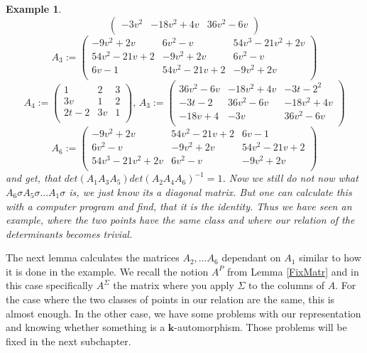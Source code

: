 \documentclass[12pt, oneside, reqno]{amsart}
\newtheorem{example}[theorem]{Example}
\begin{document}
\begin{example}
\[\begin{pmatrix}
        -3v^2 & -18 v^2 + 4v & 36v^2 - 6 v \\
    \end{pmatrix} \]
    \[A_3 := \begin{pmatrix}
        -9 v^2 + 2v & 6v^2 - v & 54v^3 - 21 v^2 + 2v \\
        54v^2 - 21 v + 2 & -9 v^2 + 2v & 6v^2 - v \\
        6v - 1 & 54v^2 - 21 v + 2 & -9 v^2 + 2v \\
    \end{pmatrix}\]
        \newline
     \[A_4 := \begin{pmatrix}
        1 & 2 & 3 \\
        3v & 1 & 2 \\
        2t-2 & 3v & 1 \\
    \end{pmatrix}, \, 
    A_3 := \begin{pmatrix}
        36v^2 - 6 v & -18 v^2 + 4v & -3t-2^2 \\
        -3t-2 & 36v^2 - 6 v & -18 v^2 + 4v \\
        -18 v + 4 & -3v & 36v^2 - 6 v \\
    \end{pmatrix}\] 
    \[A_6 := \begin{pmatrix}
        -9 v^2 + 2v & 54v^2 - 21 v + 2 &  6v - 1 \\
        6v^2 - v & -9 v^2 + 2v & 54v^2 - 21 v + 2 \\
        54v^3 - 21 v^2 + 2v & 6v^2 - v & -9 v^2 + 2v \\
    \end{pmatrix}\]
    and get, that $det(A_1A_3A_5)det(A_2A_4A_6)^{-1} = 1$. Now we still do not now what $A_6 \sigma A_5 \sigma \dots A_1 \sigma$ is, we just know its a diagonal matrix. But one can calculate this with a computer program and find, that it is the identity. Thus we have seen an example, where the two points have the same class and where our relation of the determinants becomes trivial. 
    
\end{example}
\noindent 
The next lemma calculates the matrices $A_2, \dots A_6$ dependant on $A_1$ similar to how it is done in the example. We recall the notion $A^P$ from Lemma \ref{FixMatr} and in this case specifically $A^{\Sigma}$ the matrix where you apply $\Sigma$ to the columns of $A$. For the case where the two classes of points in our relation are the same, this is almost enough. In the other case, we have some problems with our representation and knowing whether something is a $\textbf{k}$-automorphism. Those problems will be fixed in the next subchapter.
\end{document}

